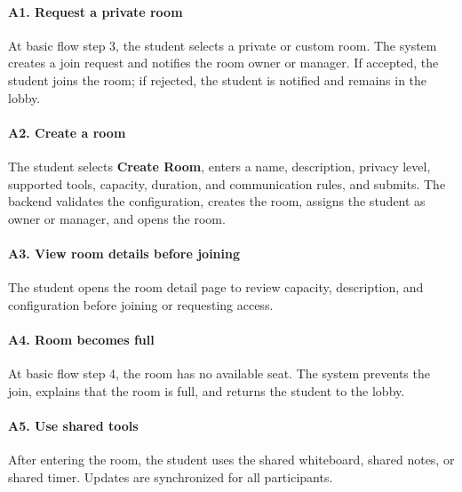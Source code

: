 \documentclass[12pt]{article}
\begin{document}
\paragraph*{A1. Request a private room}
\par\medskip
At basic flow step 3, the student selects a private or custom room. The system creates a join request and notifies the room owner or manager. If accepted, the student joins the room; if rejected, the student is notified and remains in the lobby.
\par\medskip
\hypertarget{sec:a2-create-a-room}{}
\paragraph*{A2. Create a room}
\par\medskip
The student selects \textbf{Create Room}, enters a name, description, privacy level, supported tools, capacity, duration, and communication rules, and submits. The backend validates the configuration, creates the room, assigns the student as owner or manager, and opens the room.
\par\medskip
\hypertarget{sec:a3-view-room-details-before-joining}{}
\paragraph*{A3. View room details before joining}
\par\medskip
The student opens the room detail page to review capacity, description, and configuration before joining or requesting access.
\par\medskip
\hypertarget{sec:a4-room-becomes-full}{}
\paragraph*{A4. Room becomes full}
\par\medskip
At basic flow step 4, the room has no available seat. The system prevents the join, explains that the room is full, and returns the student to the lobby.
\par\medskip
\hypertarget{sec:a5-use-shared-tools}{}
\paragraph*{A5. Use shared tools}
\par\medskip
After entering the room, the student uses the shared whiteboard, shared notes, or shared timer. Updates are synchronized for all participants.
\par\medskip
\hypertarget{sec:a6-reconnect-after-interruption}{}
\end{document}
